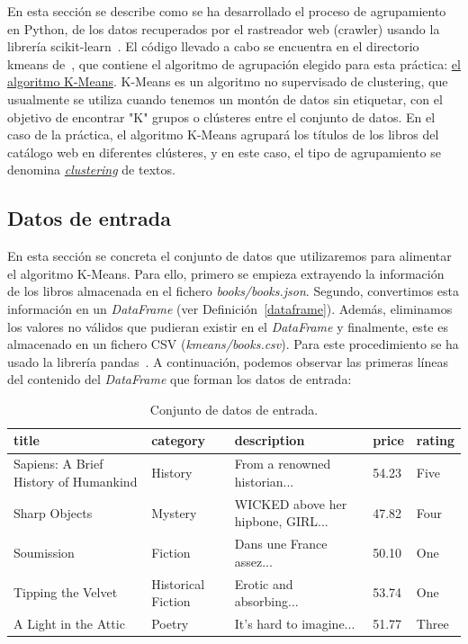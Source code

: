 \documentclass{uimppracticas}
\begin{document}
En esta sección se describe como se ha desarrollado el proceso de agrupamiento en Python, de los datos recuperados por el rastreador web (crawler) usando la librería scikit-learn~\cite{scikit-learn}. El código llevado a cabo se encuentra en el directorio kmeans de~\cite{GitHubRepo}, que contiene el algoritmo de agrupación elegido para esta práctica:  \href{https://scikit-learn.org/stable/modules/generated/sklearn.cluster.KMeans.html}{el algoritmo K-Means}. K-Means es un algoritmo no supervisado de clustering, que usualmente se utiliza cuando tenemos un montón de datos sin etiquetar, con el objetivo de encontrar "K" grupos o clústeres entre el conjunto de datos. En el caso de la práctica, el algoritmo K-Means agrupará los títulos de los libros del catálogo web en diferentes clústeres, y en este caso, el tipo de agrupamiento se denomina \href{https://en.wikipedia.org/wiki/Document_clustering}{\textit{clustering}} de textos.

\subsection{Datos de entrada}

En esta sección se concreta el conjunto de datos que utilizaremos para alimentar el algoritmo K-Means. Para ello, primero se empieza extrayendo la información de los libros almacenada en el fichero \textit{books/books.json}. Segundo, convertimos esta información en un \textit{DataFrame} (ver Definición~\ref{dataframe}). Además, eliminamos los valores no válidos que pudieran existir en el \textit{DataFrame} y finalmente, este es almacenado en un fichero CSV (\textit{kmeans/books.csv}). Para este procedimiento se ha usado la librería pandas~\cite{jeff_reback_2020_4309786}. A continuación, podemos observar las primeras líneas del contenido del \textit{DataFrame} que forman los datos de entrada:

\begin{table}[h]
	\begin{adjustbox}{width=\columnwidth,center}
		\begin{tabular}{lllll}
			\toprule
			title & category & description & price & rating \\
			\midrule
			Sapiens: A Brief History of Humankind & History & From a renowned historian... & 54.23 & Five \\
			Sharp Objects & Mystery & WICKED above her hipbone, GIRL... & 47.82 & Four \\
			Soumission & Fiction & Dans une France assez... & 50.10 & One \\
			Tipping the Velvet & Historical Fiction & Erotic and absorbing... & 53.74 & One \\
			A Light in the Attic & Poetry & It's hard to imagine... & 51.77 & Three \\
			\bottomrule
		\end{tabular}
	\end{adjustbox}
	\caption{Conjunto de datos de entrada.}
	\label{table1}
\end{table}
\end{document}
